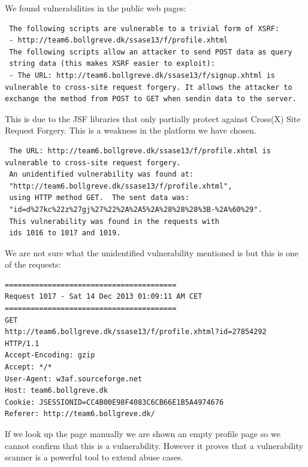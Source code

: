 \documentclass[a4paper]{article}
\begin{document}
We found vulnerabilities in the public web pages:
\begin{verbatim}
 The following scripts are vulnerable to a trivial form of XSRF:
 - http://team6.bollgreve.dk/ssase13/f/profile.xhtml
 The following scripts allow an attacker to send POST data as query 
 string data (this makes XSRF easier to exploit):
 - The URL: http://team6.bollgreve.dk/ssase13/f/signup.xhtml is 
vulnerable to cross-site request forgery. It allows the attacker to 
exchange the method from POST to GET when sendin data to the server.
\end{verbatim}
This is due to the JSF libraries that only partially protect against Cross(X) Site Request Forgery. This is a weakness in the platform we have chosen.
\begin{verbatim}
 The URL: http://team6.bollgreve.dk/ssase13/f/profile.xhtml is 
vulnerable to cross-site request forgery.
 An unidentified vulnerability was found at: 
 "http://team6.bollgreve.dk/ssase13/f/profile.xhtml", 
 using HTTP method GET.  The sent data was:
 "id=d%27kc%22z%27gj%27%22%2A%2A5%2A%28%28%28%3B-%2A%60%29". 
 This vulnerability was found in the requests with 
 ids 1016 to 1017 and 1019.
\end{verbatim}

We are not sure what the unidentified vulnerability mentioned is but this is one of the requests:
\begin{verbatim}
========================================
Request 1017 - Sat 14 Dec 2013 01:09:11 AM CET
========================================
GET 
http://team6.bollgreve.dk/ssase13/f/profile.xhtml?id=27854292 
HTTP/1.1
Accept-Encoding: gzip
Accept: */*
User-Agent: w3af.sourceforge.net
Host: team6.bollgreve.dk
Cookie: JSESSIONID=CC4B00E98F4083C6CB66E1B5A4974676
Referer: http://team6.bollgreve.dk/
\end{verbatim}

If we look up the page manually we are shown an empty profile page so we cannot confirm that this is a vulnerability. However it proves that a vulnerability scanner is a powerful tool to extend abuse cases.
\end{document}
